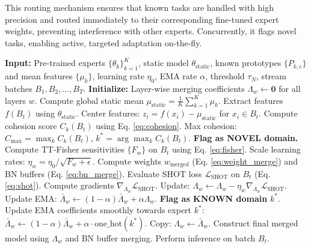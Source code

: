 \documentclass{article}
\theoremstyle{plain}
\theoremstyle{definition}
\theoremstyle{remark}
\begin{document}
This routing mechanism ensures that known tasks are handled with high precision and routed immediately to their corresponding fine-tuned expert weights, preventing interference with other experts. Concurrently, it flags novel tasks, enabling active, targeted adaptation on-the-fly.

\begin{algorithm*}[t]
\caption{Data-Free Open-World Test-Time Model Merging}
\label{alg:df_ow_ttmm}
\begin{footnotesize}
\begin{algorithmic}[1]
\STATE \textbf{Input:} Pre-trained experts $\{\theta_k\}_{k=1}^K$, static model $\theta_{\text{static}}$, known prototypes $\{P_{k, c}\}$ and mean features $\{\mu_k\}$, learning rate $\eta_0$, EMA rate $\alpha$, threshold $\tau_N$, stream batches $B_1, B_2, \dots, B_T$.
\STATE \textbf{Initialize:} Layer-wise merging coefficients $\Lambda_w \leftarrow \mathbf{0}$ for all layers $w$.
\STATE Compute global static mean $\mu_{\text{static}} = \frac{1}{K}\sum_{k=1}^K \mu_k$.
    \STATE Extract features $f(B_t)$ using $\theta_{\text{static}}$.
    \STATE Center features: $z_i = f(x_i) - \mu_{\text{static}}$ for $x_i \in B_t$.
        \STATE Compute cohesion score $C_k(B_t)$ using Eq. \ref{eq:cohesion}.
    \ENDFOR
    \STATE Max cohesion: $C_{\text{max}} = \max_k C_k(B_t)$, $k^* = \arg\max_k C_k(B_t)$.
        \STATE \textbf{Flag as NOVEL domain.}
        \STATE Compute TT-Fisher sensitivities $\{F_w\}$ on $B_t$ using Eq. \ref{eq:fisher}.
        \STATE Scale learning rates: $\eta_w = \eta_0 / \sqrt{F_w + \epsilon}$.
            \STATE Compute weights $w_{\text{merged}}$ (Eq. \ref{eq:weight_merge}) and BN buffers (Eq. \ref{eq:bn_merge}).
            \STATE Evaluate SHOT loss $\mathcal{L}_{\text{SHOT}}$ on $B_t$ (Eq. \ref{eq:shot}).
            \STATE Compute gradients $\nabla_{\Lambda_w} \mathcal{L}_{\text{SHOT}}$.
            \STATE Update: $\Lambda_w \leftarrow \Lambda_w - \eta_w \nabla_{\Lambda_w} \mathcal{L}_{\text{SHOT}}$.
        \ENDFOR
        \STATE Update EMA: $\bar{\Lambda}_w \leftarrow (1-\alpha)\bar{\Lambda}_w + \alpha \Lambda_w$.
    \ELSE
        \STATE \textbf{Flag as KNOWN domain} $k^*$.
        \STATE Update EMA coefficients smoothly towards expert $k^*$:
        \STATE $\bar{\Lambda}_w \leftarrow (1-\alpha)\bar{\Lambda}_w + \alpha \cdot \text{one\_hot}(k^*)$.
        \STATE Copy: $\Lambda_w \leftarrow \bar{\Lambda}_w$.
    \ENDIF
    \STATE Construct final merged model using $\Lambda_w$ and BN buffer merging.
    \STATE Perform inference on batch $B_t$.
\ENDFOR
\end{algorithmic}
\end{footnotesize}
\end{algorithm*}
\end{document}
